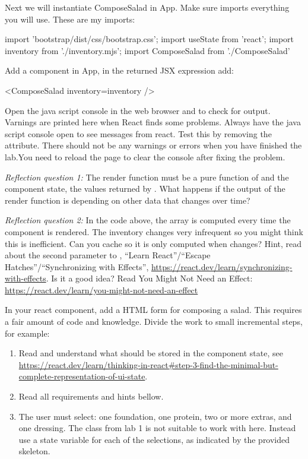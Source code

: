 \documentclass[fleqn, article, a4paper]{memoir}
\begin{document}
\begin{Assignments}
\noindent Next we will instantiate ComposeSalad in App. Make sure  imports everything you will use. These are my imports:
\begin{Code}
import 'bootstrap/dist/css/bootstrap.css';
import { useState } from 'react';
import inventory from './inventory.mjs';
import ComposeSalad from './ComposeSalad'
\end{Code}

\noindent Add a  component in App, in the returned JSX expression add:
\begin{Code}
<ComposeSalad inventory={inventory} />
\end{Code}

\noindent Open the java script console in the web browser and to check for output. Varnings are printed here when React finds some problems. Always have the java script console open to see messages from react. Test this by removing the  attribute. There should not be any warnings or errors when you have finished the lab.You need to reload the page to clear the console after fixing the problem.

\emph{Reflection question 1:} The render function must be a pure function of  and the component state, the values returned by . What happens if the output of the render function is depending on other data that changes over time?

\emph{Reflection question 2:} In the code above, the  array is computed every time the component is rendered. The inventory changes very infrequent so you might think this is inefficient. Can you cache  so it is only computed when  changes? Hint, read about the second parameter to , ``Learn React''/``Escape Hatches''/``Synchronizing with Effects'', \url{https://react.dev/learn/synchronizing-with-effects}. Is it a good idea? Read You Might Not Need an Effect: \url{https://react.dev/learn/you-might-not-need-an-effect}

\item In your  react component, add a HTML form for composing a salad. This requires a fair amount of code and knowledge. Divide the work to small incremental steps, for example:
\begin{enumerate}
  \item Read and understand what should be stored in the component state, see \url{https://react.dev/learn/thinking-in-react#step-3-find-the-minimal-but-complete-representation-of-ui-state}.
  \item Read all requirements and hints bellow.
  \item The user must select: one foundation, one protein, two or more extras, and one dressing. The  class from lab 1 is not suitable to work with here. Instead use a state variable for each of the selections, as indicated by the provided  skeleton.
  

\end{enumerate}
\end{Assignments}
\end{document}
